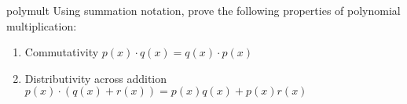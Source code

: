 
\begin {exercise}{polymult}
Using summation notation, prove the following properties of polynomial multiplication:
\begin {enumerate}[(1)]
\item
Commutativity 
$p(x)\cdot q(x) = q(x)\cdot p(x)$
\item
Distributivity across addition
$p(x)\cdot (q(x) + r(x)) =p(x)q(x) + p(x)r(x)$

\end {enumerate}
\end {exercise}

